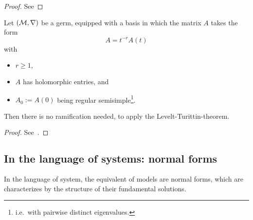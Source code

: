 \begin{proof}
  See \TODO{}
\end{proof}
\begin{prop}
  Let $(\mathcal{M},\nabla)$ be a germ, equipped with a basis in which the matrix $A$
  takes the form
  \[
    A=t^{-r}A(t)
  \]
  with
  \begin{itemize}
    \item $r\geq1$,
    \item $A$ has holomorphic entries, and
    \item $A_0:=A(0)$ being regular semisimple\footnote{i.e.\ with
      pairwise distinct eigenvalues.}.
  \end{itemize}
  Then there is no ramification needed, to apply the Levelt-Turittin-theorem.
  \begin{comment}
    Further, all the summands $\cR_\phi$ have rank one, which is not the case
    in general.
  \end{comment}
\end{prop}
\begin{proof}
  See~\cite[Thm.II.5.7]{sabbah2007isomonodromic}.
\end{proof}

\subsection{In the language of systems: normal forms}
In the language of system, the equivalent of models are normal forms, which are
characterizes by the structure of their fundamental solutions.

